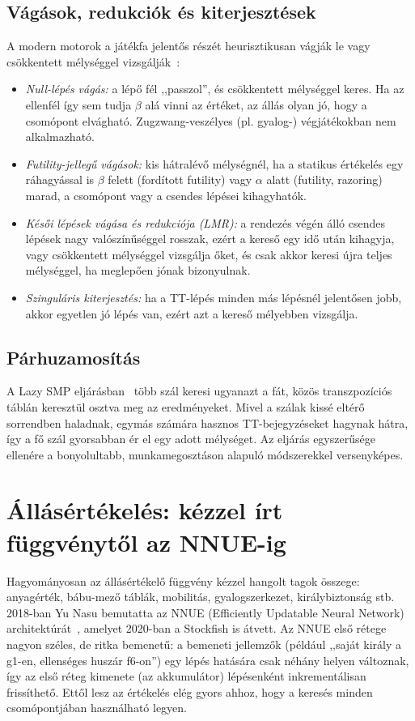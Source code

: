 \subsection{Vágások, redukciók és kiterjesztések}

A modern motorok a játékfa jelentős részét heurisztikusan vágják le vagy csökkentett mélységgel vizsgálják~\cite{CPWPruning}:
\begin{itemize}
	\item \emph{Null-lépés vágás:} a lépő fél ,,passzol'', és csökkentett mélységgel keres. Ha az ellenfél így sem tudja $\beta$ alá vinni az értéket, az állás olyan jó, hogy a csomópont elvágható. Zugzwang-veszélyes (pl. gyalog-) végjátékokban nem alkalmazható.
	\item \emph{Futility-jellegű vágások:} kis hátralévő mélységnél, ha a statikus értékelés egy ráhagyással is $\beta$ felett (fordított futility) vagy $\alpha$ alatt (futility, razoring) marad, a csomópont vagy a csendes lépései kihagyhatók.
	\item \emph{Késői lépések vágása és redukciója (LMR):} a rendezés végén álló csendes lépések nagy valószínűséggel rosszak, ezért a kereső egy idő után kihagyja, vagy csökkentett mélységgel vizsgálja őket, és csak akkor keresi újra teljes mélységgel, ha meglepően jónak bizonyulnak.
	\item \emph{Szinguláris kiterjesztés:} ha a TT-lépés minden más lépésnél jelentősen jobb, akkor egyetlen jó lépés van, ezért azt a kereső mélyebben vizsgálja.
\end{itemize}

\subsection{Párhuzamosítás}

A Lazy SMP eljárásban~\cite{CPWLazySMP} több szál keresi ugyanazt a fát, közös transzpozíciós táblán keresztül osztva meg az eredményeket. Mivel a szálak kissé eltérő sorrendben haladnak, egymás számára hasznos TT-bejegyzéseket hagynak hátra, így a fő szál gyorsabban ér el egy adott mélységet. Az eljárás egyszerűsége ellenére a bonyolultabb, munkamegosztáson alapuló módszerekkel versenyképes.

\section{Állásértékelés: kézzel írt függvénytől az NNUE-ig}

Hagyományosan az állásértékelő függvény kézzel hangolt tagok összege: anyagérték, bábu-mező táblák, mobilitás, gyalogszerkezet, királybiztonság stb. 2018-ban Yu Nasu bemutatta az NNUE (Efficiently Updatable Neural Network) architektúrát~\cite{Nasu18}, amelyet 2020-ban a Stockfish is átvett. Az NNUE első rétege nagyon széles, de ritka bemenetű: a bemeneti jellemzők (például ,,saját király a g1-en, ellenséges huszár f6-on'') egy lépés hatására csak néhány helyen változnak, így az első réteg kimenete (az akkumulátor) lépésenként inkrementálisan frissíthető. Ettől lesz az értékelés elég gyors ahhoz, hogy a keresés minden csomópontjában használható legyen.

